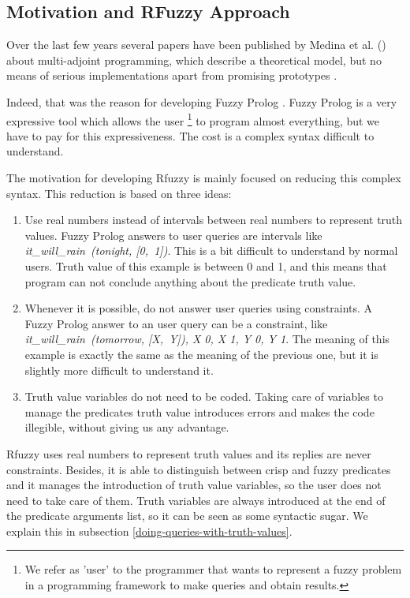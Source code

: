 \documentclass[runningheads,a4paper]{llncs}
\begin{document}
\subsection{Motivation and RFuzzy Approach}
\label{subsec:motivation}

Over the last few years several papers have been published by Medina
et al.
(\cite{M_Adjoint_Continuous,M_Adjoint_Procedural,M_Adjoint_Completeness})
about multi-adjoint programming, which describe a theoretical model,
but no means of serious implementations apart from promising
prototypes \cite{Abietar07}.

Indeed, that was the reason for developing Fuzzy Prolog \cite{Susana_FSS04}.
Fuzzy Prolog  is a very expressive tool which allows the 
user \footnote{We refer as 'user' to the programmer that
  wants to represent a fuzzy problem in a programming framework to make
  queries and obtain results.}
to program almost everything, but we have to pay for this
expressiveness.
The cost is a complex syntax difficult to understand.

The motivation for developing Rfuzzy is mainly focused on reducing this 
complex syntax. This reduction is based on three ideas:
\begin{enumerate}
\item Use real numbers instead of intervals between real numbers to 
  represent truth values.
  Fuzzy Prolog answers to user queries are intervals like \\
  {\it it\_will\_rain\ (tonight, [0,\ 1])}. 
  This is a bit difficult to understand by normal users.
  Truth value of this example is between 0 and 1, and this means that 
  program can not conclude anything about the predicate truth value.
\item Whenever it is possible, do not answer user queries using 
  constraints.
  A Fuzzy Prolog answer to an user query can be a constraint, like \\
  {\it it\_will\_rain\ (tomorrow, [X,\ Y]), X  0, X  1, Y  0, Y  1}.
  The meaning of this example is exactly the same as the meaning of 
  the previous one, but it is slightly more difficult to understand it.
\item Truth value variables do not need to be coded. 
  Taking care of variables to manage the predicates truth value 
  introduces errors and makes the code illegible, without giving us 
  any advantage.
\end{enumerate}

Rfuzzy uses real numbers to represent truth values and its replies are 
never constraints. 
Besides, it is able to distinguish between crisp and fuzzy predicates
and it manages the introduction of truth value variables, so the 
user does not need to take care of them.
Truth variables are always introduced at the end of 
the predicate arguments list, so it can be seen as some syntactic 
sugar. We explain this in subsection \ref{doing-queries-with-truth-values}.
\end{document}

